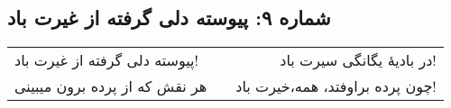 \begin{center}
\section*{شماره ۹: پیوسته دلی گرفته از غیرت باد}
\label{sec:009}
\begin{longtable}{l p{0.5cm} r}
پیوسته دلی گرفته از غیرت باد!
&&
در بادیهٔ یگانگی سیرت باد!
\\
هر نقش که از پرده برون میبینی
&&
چون پرده براوفتد، همه،‌خیرت باد!
\\
\end{longtable}
\end{center}

